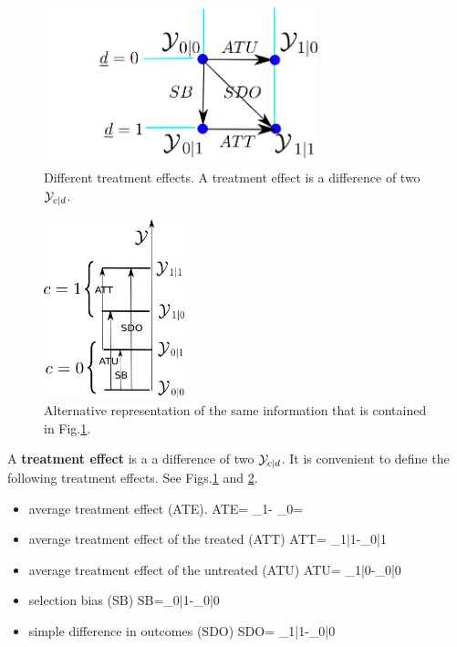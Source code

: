 \begin{figure}[h!]
\centering
\includegraphics[height=1.8in]
{pot-out/y-diffs-square.png}
\caption{Different treatment effects.
A treatment effect is a difference of
two ${\cal Y}_{c| d }$.}
\label{fig-y-diffs-square}
\end{figure}

\begin{figure}[h!]
\centering
\includegraphics[width=1.6in]
{pot-out/po-y-levels.png}
\caption{Alternative
representation of the same
information that is contained in
Fig.\ref{fig-y-diffs-square}.}
\label{fig-po-y-levels}
\end{figure}

A {\bf treatment effect} is a
a difference of two  ${\cal Y}_{c| d }$.
It is convenient to
define the following
treatment effects.
See Figs.\ref{fig-y-diffs-square}
and \ref{fig-po-y-levels}.




\begin{itemize}


\item average treatment effect
 (ATE).
\beq
{\color{red}ATE}=
\caly_{1}-
\caly_{0}= \delta
\eeq

\item average treatment effect
of the treated (ATT)
\beq
{\color{red}ATT}=
\caly_{1|1}-\caly_{0|1}
\eeq


\item average
treatment effect of the untreated (ATU)
\beq
{\color{red}ATU}=
\caly_{1|0}-\caly_{0|0}
\eeq

\item selection bias (SB)
\beq
{\color{red}SB}=\caly_{0|1}-\caly_{0|0}
\eeq


\item simple difference in outcomes (SDO)
\beq
{\color{red} SDO}= \caly_{1|1}-\caly_{0|0}
\eeq


\end{itemize}



